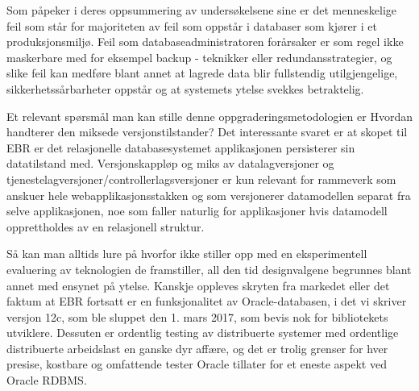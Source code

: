 Som \cite{oliveira2006understanding} påpeker i deres oppsummering av undersøkelsene sine er det menneskelige feil som står for majoriteten av feil som oppstår i databaser som kjører i et produksjonsmiljø. Feil som databaseadministratoren forårsaker er som regel ikke maskerbare med for eksempel backup - teknikker eller redundansstrategier, og slike feil kan medføre blant annet at lagrede data blir fullstendig utilgjengelige, sikkerhetssårbarheter oppstår og at systemets ytelse svekkes betraktelig.

Et relevant spørsmål man kan stille denne oppgraderingsmetodologien er Hvordan handterer den miksede versjonstilstander? Det interessante svaret er at skopet til EBR er det relasjonelle databasesystemet applikasjonen persisterer sin datatilstand med. Versjonskappløp og miks av datalagversjoner og tjenestelagversjoner/controllerlagsversjoner er kun relevant for rammeverk som anskuer hele webapplikasjonsstakken og som versjonerer datamodellen separat fra selve applikasjonen, noe som faller naturlig for applikasjoner hvis datamodell opprettholdes av en relasjonell struktur.

Så kan man alltids lure på hvorfor \cite{choi2009} ikke stiller opp med en eksperimentell evaluering av teknologien de framstiller, all den tid designvalgene begrunnes blant annet med ensynet på ytelse. Kanskje oppleves skryten fra markedet eller det faktum at EBR fortsatt er en funksjonalitet av Oracle-databasen, i det vi skriver versjon 12c, som ble sluppet den 1. mars 2017, som bevis nok for bibliotekets utviklere. Dessuten er ordentlig testing av distribuerte systemer med ordentlige distribuerte arbeidslast en ganske dyr affære, og det er trolig grenser for hver presise, kostbare og omfattende tester Oracle tillater for et eneste aspekt ved Oracle RDBMS.
